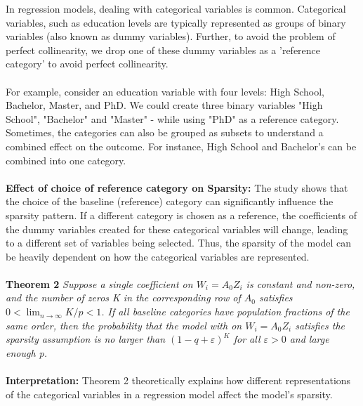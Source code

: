 In regression models, dealing with categorical variables is common. Categorical variables, such as education levels are typically represented as groups of binary variables (also known as dummy variables). Further, to avoid the problem of perfect collinearity, we drop one of these dummy variables as a 'reference category' to avoid perfect collinearity. \\
\\
For example, consider an education variable with four levels: High School, Bachelor, Master, and PhD. We could create three binary variables "High School", "Bachelor" and "Master" - while using "PhD" as a reference category. Sometimes, the categories can also be grouped as subsets to understand a combined effect on the outcome. For instance, High School and Bachelor's can be combined into one category.\\
\\
\textbf{Effect of choice of reference category on Sparsity:}
The study shows that the choice of the baseline (reference) category can significantly influence the sparsity pattern. If a different category is chosen as a reference, the coefficients of the dummy variables created for these categorical variables will change, leading to a different set of variables being selected. Thus, the sparsity of the model can be heavily dependent on how the categorical variables are represented.\\
\\
\textbf{Theorem 2} 
\textit{Suppose a single coefficient on $W_i = A_0 Z_i$  is constant and non-zero, and the number of zeros K in the corresponding row of $A_0$ satisfies $0<\lim _{n \rightarrow \infty} K / p<1$. If all baseline categories have population fractions of the same order, then the probability that the model with on $W_i = A_0 Z_i$ satisfies the sparsity assumption is no larger than $(1-q+\varepsilon)^K$ for all $\varepsilon>0$ and large enough p.}\\
\\
\textbf{Interpretation:} Theorem 2 theoretically explains how different representations of the categorical variables in a regression model affect the model's sparsity.\\ 

